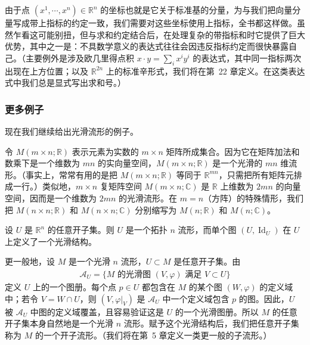 \documentclass[../../main.tex]{subfiles}
\begin{document}
由于点 $(x^{1},\cdots ,x^{n})\in\mathbb{R}^{n}$ 的坐标也就是它关于标准基的分量，为与我们把向量分量写成带上指标的约定一致，我们需要对这些坐标使用上指标，全书都这样做。虽然乍看这可能别扭，但与求和约定结合后，在处理复杂的带指标和时它提供了巨大优势，其中之一是：不具数学意义的表达式往往会因违反指标约定而很快暴露自己。（主要例外是涉及欧几里得点积 $x\cdot y=\sum_{i}x^{i}y^{i}$ 的表达式，其中同一指标两次出现在上方位置；以及 $\mathbb{R}^{2n}$ 上的标准辛形式，我们将在第~22 章定义。在这类表达式中我们总是显式写出求和号。）

\subsubsection{更多例子}\label{subsubsection:ch01-更多例子}
现在我们继续给出光滑流形的例子。

\begin{example}[矩阵空间]\label{example:ch01-矩阵空间}
令 $M(m\times n;\mathbb{R})$ 表示元素为实数的 $m\times n$ 矩阵所成集合。因为它在矩阵加法和数乘下是一个维数为 $mn$ 的实向量空间，$M(m\times n;\mathbb{R})$ 是一个光滑的 $mn$ 维流形。（事实上，常常有用的是把 $M(m\times n;\mathbb{R})$ 等同于 $\mathbb{R}^{mn}$，只需把所有矩阵元排成一行。）类似地，$m\times n$ 复矩阵空间 $M(m\times n;\mathbb{C})$ 是 $\mathbb{R}$ 上维数为 $2mn$ 的向量空间，因而是一个维数为 $2mn$ 的光滑流形。在 $m=n$（方阵）的特殊情形，我们把 $M(n\times n;\mathbb{R})$ 和 $M(n\times n;\mathbb{C})$ 分别缩写为 $M(n;\mathbb{R})$ 和 $M(n;\mathbb{C})$。
\end{example}

\begin{example}[开子流形]\label{example:ch01-开子流形}
设 $U$ 是 $\mathbb{R}^{n}$ 的任意开子集。则 $U$ 是一个拓扑 $n$ 流形，而单个图 $(U,\operatorname{Id}_{U})$ 在 $U$ 上定义了一个光滑结构。

更一般地，设 $M$ 是一个光滑 $n$ 流形，$U\subset M$ 是任意开子集。由
\begin{align*}
\mathcal{A}_{U}=\{\text{$M$ 的光滑图 $(V,\varphi)$ 满足 }V\subset U\}
\end{align*}
定义 $U$ 上的一个图册。每个点 $p\in U$ 都包含在 $M$ 的某个图 $(W,\varphi)$ 的定义域中；若令 $V=W\cap U$，则 $(V,\varphi|_{V})$ 是 $\mathcal{A}_{U}$ 中一个定义域包含 $p$ 的图。因此，$U$ 被 $\mathcal{A}_{U}$ 中图的定义域覆盖，且容易验证这是 $U$ 的一个光滑图册。所以 $M$ 的任意开子集本身自然地是一个光滑 $n$ 流形。赋予这个光滑结构后，我们把任意开子集称为 $M$ 的一个开子流形。（我们将在第~5 章定义一类更一般的子流形。）
\end{example}
\end{document}
